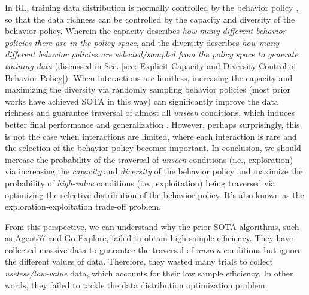 \documentclass[nohyperref]{article}
\theoremstyle{plain}
\begin{document}
 In RL, training data distribution is normally controlled by the behavior policy \citep{sutton,dqn}, so that the data richness can be controlled by the capacity and diversity  of the behavior policy. Wherein the capacity describes \emph{how many different behavior policies there are in the policy space}, and the diversity describes \emph{how many different behavior policies are  selected/sampled from the policy space to generate training data} (discussed in Sec. \ref{sec: Explicit  Capacity and Diversity  Control of Behavior Policy}). When interactions are limitless, increasing the capacity and maximizing the diversity  via randomly sampling behavior policies (most prior works have achieved SOTA in this way) can significantly improve the data richness and guarantee traversal of almost all \emph{unseen} conditions, which induces better final performance \citep{agent57} and generalization  \citep{ghosh2021generalization}. However, perhaps surprisingly, this is not the case when interactions are limited, where each interaction is rare and the selection of the behavior policy becomes important. In conclusion, we should increase the probability of the traversal of \emph{unseen} conditions (i.e., exploration) via increasing the \emph{capacity} and \emph{diversity} of the behavior policy  and maximize the probability of  \emph{high-value} conditions (i.e., exploitation) being traversed via optimizing the selective distribution of the behavior policy. It's also known as  the  exploration-exploitation trade-off problem. 
 
 From this perspective, we can understand why the prior SOTA algorithms, such as Agent57  and Go-Explore, failed  to obtain high sample efficiency. They have collected massive data to guarantee the traversal of \emph{unseen} conditions but ignore the different values of data. Therefore, they wasted many  trials to collect  \emph{useless/low-value} data, which accounts for their low sample efficiency. In other words, they failed to tackle the data distribution optimization problem.
\end{document}
